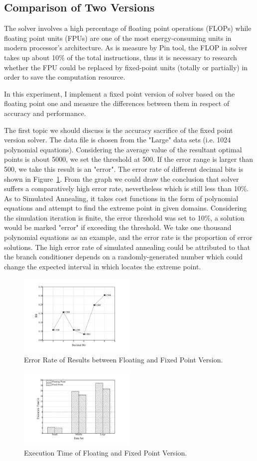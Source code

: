 \subsection{Comparison of Two Versions}
\label{sec:comparison} 
The \SA solver involves a high percentage of floating point operations (FLOPs) while floating point units (FPUs) are one of the most energy-consuming units in modern processor's architecture. As is measure by Pin tool, the FLOP in \SA solver takes up about 10\% of the total instructions, thus it is necessary to research whether the FPU could be replaced by fixed-point units (totally or partially) in order to save the computation resource. 

In this experiment, I implement a fixed point version of \SA solver based on the floating point one and measure the differences between them in respect of accuracy and performance. 

The first topic we should discuss is the accuracy sacrifice of the fixed point version solver. The data file is chosen from the "Large" data sets (i.e. 1024 polynomial equations). Considering the average value of the resultant optimal points is about 5000, we set the threshold at 500. If the error range is larger than 500, we take this result is an "error". The error rate of different decimal bits is shown in Figure~\ref{fig:ER}.
From the graph we could draw the conclusion that \SA solver suffers a comparatively high error rate, nevertheless which is still less than 10\%.
As to Simulated Annealing, it takes cost functions in the form of
polynomial equations and attempt to find the extreme point in given
domains. Considering the simulation iteration is finite, the error
threshold was set to 10\%, a solution would be marked "error" if exceeding the threshold. We take one thousand polynomial equations
as an example, and the error rate is the proportion of error solutions.
The high error rate of simulated annealing could be attributed to
that the branch conditioner depends on a randomly-generated number which could change the expected interval in which locates the
extreme point. 

\begin{figure}
\centering
\includegraphics[width=0.50\textwidth]{graph/ER.pdf}
\caption{Error Rate of Results between Floating and Fixed Point Version.}
\label{fig:ER}
\end{figure}

\begin{figure}
\centering
\includegraphics[width=0.50\textwidth]{graph/execution_time.pdf}
\caption{Execution Time of Floating and Fixed Point Version.}
\label{fig:execution_time}
\end{figure}